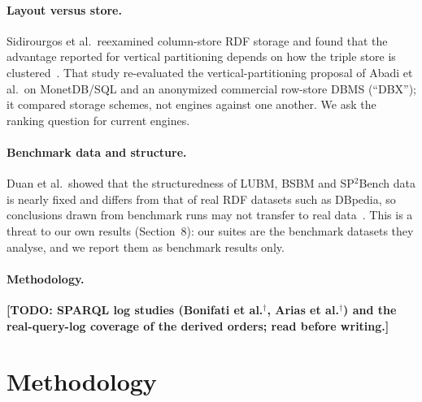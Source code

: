 \documentclass[11pt]{article}
\newcommand{\todo}[1]{\textbf{[TODO: #1]}}
\newcommand{\unread}{$^{\dagger}$}
\begin{document}
\paragraph{Layout versus store.} Sidirourgos et al.\ reexamined column-store RDF storage and found that the advantage
reported for vertical partitioning depends on how the triple store is clustered~\cite{sidirourgos2008}. That study
re-evaluated the vertical-partitioning proposal of Abadi et al.\ on MonetDB/SQL and an anonymized commercial row-store DBMS (``DBX''); it compared storage schemes, not engines against one another.
We ask the ranking question for current engines.

\paragraph{Benchmark data and structure.} Duan et al.\ showed that the structuredness of LUBM, BSBM and SP$^2$Bench data is
nearly fixed and differs from that of real RDF datasets such as DBpedia, so conclusions drawn from benchmark runs may not transfer
to real data~\cite{duan2011}. This is a threat to our own results (Section~8): our suites are the benchmark datasets they analyse,
and we report them as benchmark results only.

\paragraph{Methodology.} \todo{SPARQL log studies (Bonifati et al.\unread, Arias et al.\unread) and the real-query-log coverage of the derived orders; read before writing.}

\section{Methodology}
\end{document}
